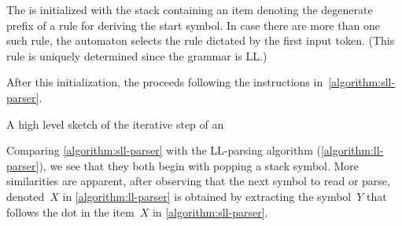 The \RLLp is initialized with the stack containing an item denoting the
degenerate prefix of a rule for deriving the start symbol. In case there are
more than one such rule, the automaton selects the rule dictated by the first
input token. (This rule is uniquely determined since the grammar is LL.)

After this initialization, the \RLLp proceeds following the instructions
in~\cref{algorithm:sll-parser}.

\begin{algorithm}
  \caption{\label{algorithm:sll-parser}
  A high level sketch of the iterative step of an \RLLp
}
  \begin{algorithmic}[1]
         \CONTINUE{}
      \FI
      \FI %
    \FI
      \CONTINUE{}
      \FI
    \FI
    \FI
      \CONTINUE{}
    \FI
     
  \end{algorithmic}
\end{algorithm}

Comparing \cref{algorithm:sll-parser} with the LL-parsing algorithm
(\cref{algorithm:ll-parser}), we see that they both begin with popping a stack
symbol. More similarities are apparent, after observing that the next
symbol to read or parse, denoted~$X$ in \cref{algorithm:ll-parser} is obtained
by extracting the symbol~$Y$ that follows the dot in the item~$X$ in
\cref{algorithm:sll-parser}.

